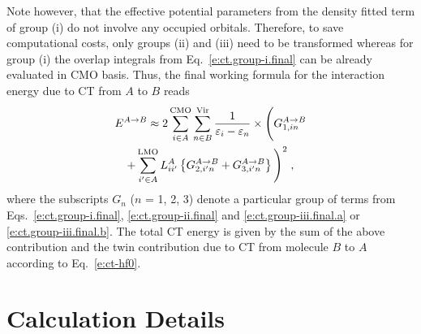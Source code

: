 Note however, that the effective potential parameters from the density fitted term of group (i) 
do not involve any occupied orbitals.
Therefore, to save computational costs, only groups (ii) and (iii) need to be transformed
whereas for group (i) the overlap integrals from Eq.~\eqref{e:ct.group-i.final} 
can be already evaluated in CMO basis.
Thus, the final working formula for the interaction energy due to CT from $A$ to $B$ reads
%
\begin{multline} \label{e:ect-oep.final}
 E^{A\rightarrow B} \approx
 2 
 \sum_{i\in A}^{\rm CMO}
 \sum_{n\in B}^{\rm Vir}
 \frac{1}{\varepsilon_i - \varepsilon_n} \times 
 \Bigg(
   G_{1,in}^{A\rightarrow B} \\
  +
   \sum_{i'\in A}^{\rm LMO} L_{ii'}^A
   \left\{
   G_{2,i'n}^{A\rightarrow B}
  +G_{3,i'n}^{A\rightarrow B}
  \right\}
 \Bigg)^2 \;,
\end{multline}
%
where the subscripts $G_n$ ($n$ = 1, 2, 3) denote a particular group of 
terms from Eqs.~\eqref{e:ct.group-i.final}, \eqref{e:ct.group-ii.final} and \eqref{e:ct.group-iii.final.a}
or \eqref{e:ct.group-iii.final.b}. 
The total CT energy is given by the sum of the above contribution and the twin contribution
due to CT from molecule $B$ to $A$ according to Eq.~\eqref{e:ct-hf0}.

%
%




\section{\label{s:4.calculations}Calculation Details}

